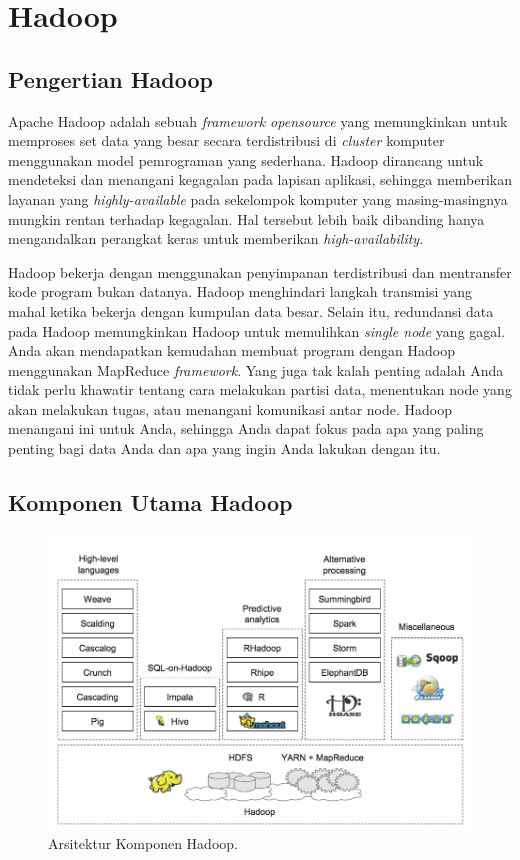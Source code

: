 \section{Hadoop}
\label{sec:hadoop}

\subsection{Pengertian Hadoop}
\label{sec:pengertian_hadoop}
Apache Hadoop adalah sebuah \textit{framework opensource} yang memungkinkan untuk memproses set data yang besar secara terdistribusi di \textit{cluster} komputer menggunakan model pemrograman yang sederhana. Hadoop dirancang untuk mendeteksi dan menangani kegagalan pada lapisan aplikasi, sehingga memberikan layanan yang \textit{highly-available} pada sekelompok komputer yang masing-masingnya mungkin rentan terhadap kegagalan. Hal tersebut lebih baik dibanding hanya mengandalkan perangkat keras untuk memberikan \textit{high-availability}.

Hadoop bekerja dengan menggunakan penyimpanan terdistribusi dan mentransfer kode program bukan datanya. Hadoop menghindari langkah transmisi yang mahal ketika bekerja dengan kumpulan data besar. Selain itu, redundansi data pada Hadoop memungkinkan Hadoop untuk memulihkan \textit{single node} yang gagal. Anda akan mendapatkan kemudahan membuat program dengan Hadoop menggunakan MapReduce \textit{framework}. Yang juga tak kalah penting adalah Anda tidak perlu khawatir tentang cara melakukan partisi data, menentukan node yang akan melakukan tugas, atau menangani komunikasi antar node. Hadoop menangani ini untuk Anda, sehingga Anda dapat fokus pada apa yang paling penting bagi data Anda dan apa yang ingin Anda lakukan dengan itu.

\subsection{Komponen Utama Hadoop}
\label{sec:komponen_utama_hadoop}
\begin{figure}
	\centering
	\includegraphics[scale=0.5]{Gambar/hadoop-architecture.png}
	\caption[Arsitektur Komponen Hadoop]{Arsitektur Komponen Hadoop.\cite{holmes2012hadoop}} 
	\label{fig:komponen_utama_hadoop}
\end{figure}

